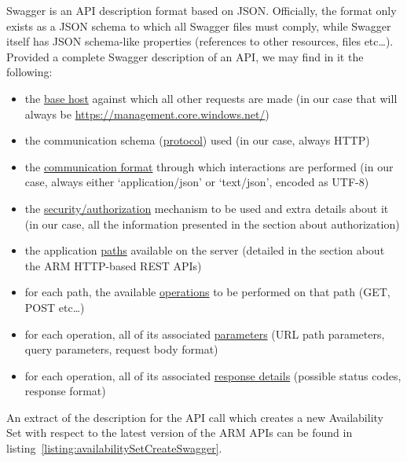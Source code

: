 \documentclass[11pt]{report}
\begin{document}

Swagger is an API description format based on JSON\@. Officially, the format only
exists as a JSON schema to which all Swagger files must comply, while Swagger
itself has JSON schema-like properties (references to other resources, files
etc\ldots). Provided a complete Swagger description of an API, we may find in
it the following:

\begin{itemize}
    \item{} the \ul{base host} against which all other requests are made (in our
        case that will always be \url{https://management.core.windows.net/})
    \item{} the communication schema (\ul{protocol}) used (in our case,
        always HTTP)
    \item{} the \ul{communication format} through which interactions are
        performed (in our case, always either `application/json' or
        `text/json', encoded as UTF-8)
    \item{} the \ul{security/authorization} mechanism to be used and extra details
        about it (in our case, all the information presented in the section
        about authorization)
    \item{} the application \ul{paths} available on the server (detailed in the
        section about the ARM HTTP-based REST APIs)
    \item{} for each path, the available \ul{operations} to be performed on
        that path (GET, POST etc\ldots)
    \item{} for each operation, all of its associated \ul{parameters} (URL path
        parameters, query parameters, request body format)
    \item{} for each operation, all of its associated \ul{response details}
        (possible status codes, response format)
\end{itemize}

An extract of the description for the API call which creates a new
Availability Set with respect to the latest version of the ARM APIs can be
found in listing~\ref{listing:availabilitySetCreateSwagger}.
\end{document}
